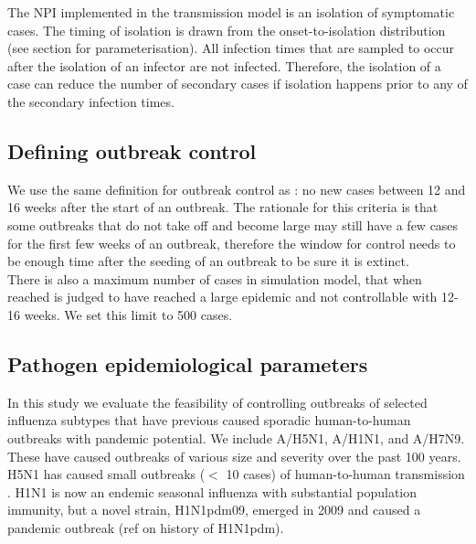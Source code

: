 \documentclass{article}
\begin{document}
The NPI implemented in the transmission model is an isolation of symptomatic cases. The timing of isolation is drawn from the onset-to-isolation distribution (see  section for parameterisation). All infection times that are sampled to occur after the isolation of an infector are not infected. Therefore, the isolation of a case can reduce the number of secondary cases if isolation happens prior to any of the secondary infection times. \\

\subsection*{Defining outbreak control}

We use the same definition for outbreak control as \cite{hellewellFeasibilityControllingCOVID192020}: no new cases between 12 and 16 weeks after the start of an outbreak. The rationale for this criteria is that some outbreaks that do not take off and become large may still have a few cases for the first few weeks of an outbreak, therefore the window for control needs to be enough time after the seeding of an outbreak to be sure it is extinct. \\

There is also a maximum number of cases in simulation model, that when reached is judged to have reached a large epidemic and not controllable with 12-16 weeks. We set this limit to 500 cases.

\subsection*{Pathogen epidemiological parameters} \label{epiparameters}

In this study we evaluate the feasibility of controlling outbreaks of selected influenza subtypes that have previous caused sporadic human-to-human outbreaks with pandemic potential. We include A/H5N1, A/H1N1, and A/H7N9. These have caused outbreaks of various size and severity over the past 100 years. H5N1 has caused small outbreaks ($<$ 10 cases) of human-to-human transmission \citep{yangDetectingHumanhumanTransmission2007a, aditamaAvianInfluenzaH5N12012a}. H1N1 is now an endemic seasonal influenza with substantial population immunity, but a novel strain, H1N1pdm09, emerged in 2009 and caused a pandemic outbreak \citep{fraserPandemicPotentialStrain2009, lesslerOutbreak2009Pandemic2009} (ref on history of H1N1pdm). \\
\end{document}
